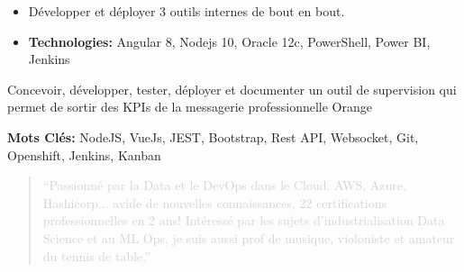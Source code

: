 \documentclass[10pt,a4paper,normalphoto]{altacv}
\begin{document}
\begin{paracol}{2}
\divider
{}
\begin{itemize}
\item Développer et déployer 3 outils internes de bout en bout.
\item \textbf{Technologies:} Angular 8, Nodejs 10, Oracle 12c, PowerShell, Power BI, Jenkins
\end{itemize}
\medskip

\item Concevoir, développer, tester, déployer et documenter un outil de supervision qui permet de sortir des KPIs de la messagerie professionnelle Orange
\item \textbf{Mots Clés:} NodeJS, VueJs, JEST, Bootstrap, Rest API, Websocket, Git, Openshift, Jenkins, Kanban
\medskip






\switchcolumn



\begin{quote}
\textcolor{LightGrey}{``Passionné par la Data et le DevOps dans le Cloud. AWS, Azure, Hashicorp... avide de nouvelles connaissances, 22 certifications professionnelles en 2 ans! Intéressé par les sujets d'industrialisation Data Science et au ML Ops, je suis aussi prof de musique, violoniste et amateur du tennis de table.''}
\end{quote}


 \\


\end{paracol}
\end{document}
